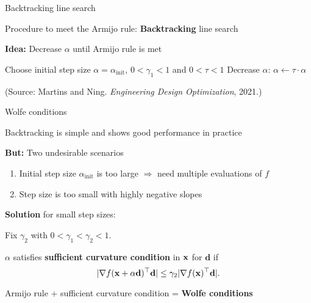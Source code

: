\documentclass[11pt,compress,t,notes=noshow, xcolor=table]{beamer}
\begin{document}
\begin{framei}[fs=small]{Backtracking line search}
\item Procedure to meet the Armijo rule: \textbf{Backtracking} line search
\item \textbf{Idea:} Decrease $\alpha$ until Armijo rule is met
\begin{algorithm}[H]
\caption{Backtracking line search}
\begin{algorithmic}[1]
\State Choose initial step size $\alpha = \alpha_{\text{init}}$, $0 < \gamma_1 < 1$ and $0 < \tau < 1$
\State Decrease $\alpha$: $\alpha \leftarrow \tau \cdot \alpha$
\EndWhile
\end{algorithmic}
\end{algorithm}
\begin{center}\footnotesize(Source: Martins and Ning. \textit{Engineering Design Optimization}, 2021.)\end{center}
\end{framei}
	
\begin{framei}{Wolfe conditions}
\item Backtracking is simple and shows good performance in practice
\item \textbf{But:} Two undesirable scenarios
\begin{enumerate}
\item Initial step size $\alpha_{\text{init}}$ is too large $\Rightarrow$ need multiple evaluations of $f$
\item Step size is too small with highly negative slopes
\end{enumerate}
\item\textbf{Solution} for small step sizes:
\begin{itemizeM}
\item Fix $\gamma_2$ with $0 < \gamma_1 < \gamma_2 < 1$.
\item $\alpha$ satisfies \textbf{sufficient curvature condition} in $\mathbf{x}$ for $\mathbf{d}$ if
$$| \nabla f(\mathbf{x} + \alpha \mathbf{d})^\top \mathbf{d} | \leq \gamma_2 | \nabla f(\mathbf{x})^\top \mathbf{d} |.$$
\end{itemizeM}
\begin{framed}
Armijo rule + sufficient curvature condition = \textbf{Wolfe conditions}
\end{framed}
\end{framei}
\end{document}
